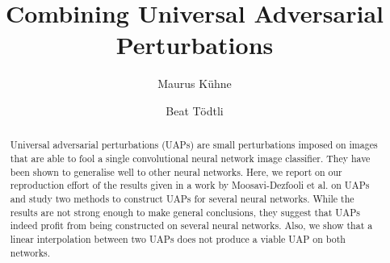 \documentclass[runningheads]{llncs}
\begin{document}
%
\title{Combining Universal Adversarial Perturbations}%
%
%
\author{Maurus K\"uhne \and
Beat Tödtli} %
%
%
%
\maketitle              %
%
\begin{abstract}
Universal adversarial perturbations (UAPs) are small perturbations imposed on images that are able to fool a single convolutional neural network image classifier. They have been shown to generalise well to other neural networks. Here, we report on our reproduction effort of the results given in a work by Moosavi-Dezfooli et al. on UAPs and study two methods to construct UAPs for several neural networks. While the results are not strong enough to make general conclusions, they suggest that UAPs indeed profit from being constructed on several neural networks. Also, we show that a linear interpolation between two UAPs does not produce a viable UAP on both networks.
\end{abstract}
%
%
%
\end{document}
